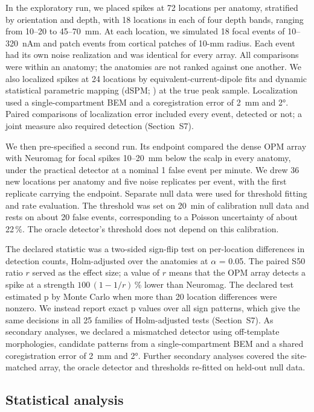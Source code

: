 \documentclass[preprint,12pt,authoryear,a4paper]{elsarticle}
\begin{document}
In the exploratory run, we placed spikes at 72 locations per anatomy, stratified by orientation and depth, with 18 locations in each of four depth bands, ranging from 10–20 to 45–70~mm. At each location, we simulated 18 focal events of 10–320~nAm and patch events from cortical patches of 10-mm radius. Each event had its own noise realization and was identical for every array. All comparisons were within an anatomy; the anatomies are not ranked against one another. We also localized spikes at 24 locations by equivalent-current-dipole fits and dynamic statistical parametric mapping (dSPM; \citealp{dale2000}) at the true peak sample. Localization used a single-compartment BEM and a coregistration error of 2~mm and 2°. Paired comparisons of localization error included every event, detected or not; a joint measure also required detection (Section~S7).

We then pre-specified a second run. Its endpoint compared the dense OPM array with Neuromag for focal spikes 10–20~mm below the scalp in every anatomy, under the practical detector at a nominal 1 false event per minute. We drew 36 new locations per anatomy and five noise replicates per event, with the first replicate carrying the endpoint. Separate null data were used for threshold fitting and rate evaluation. The threshold was set on 20~min of calibration null data and rests on about 20 false events, corresponding to a Poisson uncertainty of about 22\,\%. The oracle detector's threshold does not depend on this calibration.

The declared statistic was a two-sided sign-flip test on per-location differences in detection counts, Holm-adjusted over the anatomies \citep{holm1979} at $\alpha$ = 0.05. The paired S50 ratio $r$ served as the effect size; a value of $r$ means that the OPM array detects a spike at a strength $100\,(1 - 1/r)$\,\% lower than Neuromag. The declared test estimated p by Monte Carlo when more than 20 location differences were nonzero. We instead report exact p values over all sign patterns, which give the same decisions in all 25 families of Holm-adjusted tests (Section~S7). As secondary analyses, we declared a mismatched detector using off-template morphologies, candidate patterns from a single-compartment BEM and a shared coregistration error of 2~mm and 2°. Further secondary analyses covered the site-matched array, the oracle detector and thresholds re-fitted on held-out null data.

\subsection{Statistical analysis}\label{sec:stats}
\end{document}
